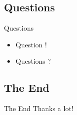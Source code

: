 \subsection{Questions}
\begin{frame}{Questions}
\begin{itemize}
\item<1> Question !
\item<2> Questions ?
\end{itemize}
\end{frame}

\subsection{The End}
\begin{frame}{The End}
Thanks a lot!
\end{frame}



